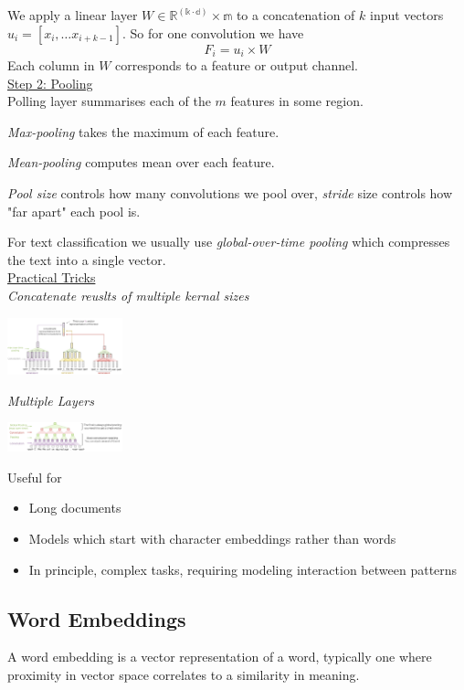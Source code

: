 \documentclass[8pt]{extarticle} %
\begin{document}
\begin{multicols*}{3}
We apply a linear layer $W\in\mathbb{R^(k\cdot d)\times m}$ to a concatenation of $k$ input vectors $u_i=\left[x_i, \ldots x_{i+k-1}\right]$. So for one convolution we have
$$F_i = u_i \times W$$
Each column in $W$ corresponds to a feature or output channel.\\

\underline{Step 2: Pooling}\\
Polling layer summarises each of the $m$ features in some region.

\textit{Max-pooling} takes the maximum of each feature.

\textit{Mean-pooling} computes mean over each feature.

\textit{Pool size} controls how many convolutions we pool over, \textit{stride} size controls how "far apart" each pool is.

For text classification we usually use \textit{global-over-time pooling} which compresses the text into a single vector. \\

\underline{Practical Tricks}\\
\textit{Concatenate reuslts of multiple kernal sizes}
\begin{center}
\includegraphics*[width=0.25\textwidth]{media/multiple-kers.png}
\end{center}
\textit{Multiple Layers}
\begin{center}
\includegraphics*[width=0.25\textwidth]{media/multiple-layers.png}
\end{center}
Useful for
\begin{itemize}[label=\textbullet, labelsep=0.3em, leftmargin=0.5em, itemsep=0em]
    \item Long documents
    \item Models which start with character embeddings rather than words
    \item In principle, complex tasks, requiring modeling interaction
    between patterns
\end{itemize}

\subsection*{Word Embeddings}
A word embedding is a vector representation of a word, typically one where proximity in vector space correlates to a similarity in meaning.

\end{multicols*}
\end{document}

